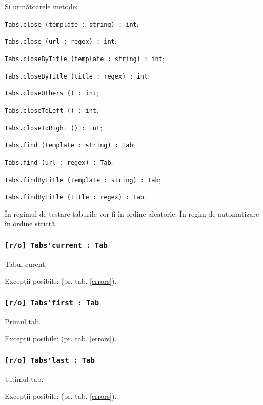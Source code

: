 Și următoarele metode:
\begin{icItems}
	\item \lstinline|Tabs.close (template : string) : int|;
	\item \lstinline|Tabs.close (url : regex) : int|;
	\item \lstinline|Tabs.closeByTitle (template : string) : int|;
	\item \lstinline|Tabs.closeByTitle (title : regex) : int|;
	\item \lstinline|Tabs.closeOthers () : int|;
	\item \lstinline|Tabs.closeToLeft () : int|;
	\item \lstinline|Tabs.closeToRight () : int|;
	\item \lstinline|Tabs.find (template : string) : Tab|;
	\item \lstinline|Tabs.find (url : regex) : Tab|;
	\item \lstinline|Tabs.findByTitle (template : string) : Tab|;
	\item \lstinline|Tabs.findByTitle (title : regex) : Tab|.
\end{icItems}

În regimul de testare taburile vor fi în ordine aleatorie. În regim de automatizare în ordine strictă.

\subsubsection{\lstinline|[r/o] Tabs'current : Tab|}

Tabul curent.

Excepții posibile:  (pr. tab. \ref{errors}).

\subsubsection{\lstinline|[r/o] Tabs'first : Tab|}

Primul tab.

Excepții posibile:  (pr. tab. \ref{errors}).

\subsubsection{\lstinline|[r/o] Tabs'last : Tab|}

Ultimul tab.

Excepții posibile:  (pr. tab. \ref{errors}).

